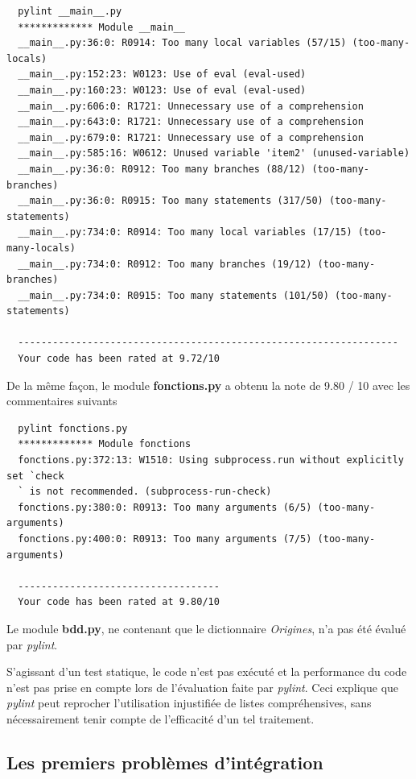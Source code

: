 \documentclass[twoside,a4paper,11pt,frenchb,openany]{report}
\begin{document}
\begin{verbatim}  pylint __main__.py
  ************* Module __main__
  __main__.py:36:0: R0914: Too many local variables (57/15) (too-many-locals)
  __main__.py:152:23: W0123: Use of eval (eval-used)
  __main__.py:160:23: W0123: Use of eval (eval-used)
  __main__.py:606:0: R1721: Unnecessary use of a comprehension
  __main__.py:643:0: R1721: Unnecessary use of a comprehension
  __main__.py:679:0: R1721: Unnecessary use of a comprehension
  __main__.py:585:16: W0612: Unused variable 'item2' (unused-variable)
  __main__.py:36:0: R0912: Too many branches (88/12) (too-many-branches)
  __main__.py:36:0: R0915: Too many statements (317/50) (too-many-statements)
  __main__.py:734:0: R0914: Too many local variables (17/15) (too-many-locals)
  __main__.py:734:0: R0912: Too many branches (19/12) (too-many-branches)
  __main__.py:734:0: R0915: Too many statements (101/50) (too-many-statements)

  ------------------------------------------------------------------
  Your code has been rated at 9.72/10\end{verbatim}

De la même façon, le module \textbf{fonctions.py} a obtenu la note de 9.80 / 10 avec les commentaires suivants

\begin{verbatim}  pylint fonctions.py
  ************* Module fonctions
  fonctions.py:372:13: W1510: Using subprocess.run without explicitly set `check
  ` is not recommended. (subprocess-run-check)
  fonctions.py:380:0: R0913: Too many arguments (6/5) (too-many-arguments)
  fonctions.py:400:0: R0913: Too many arguments (7/5) (too-many-arguments)

  -----------------------------------
  Your code has been rated at 9.80/10\end{verbatim}

Le module \textbf{bdd.py}, ne contenant que le dictionnaire \textit{Origines}, n'a pas été évalué par \textit{pylint}.

S'agissant d'un test statique, le code n'est pas exécuté et la performance du code n'est pas prise en compte lors de l'évaluation faite par \textit{pylint}. Ceci explique que \textit{pylint} peut reprocher l'utilisation injustifiée de listes compréhensives, sans nécessairement tenir compte de l'efficacité d'un tel traitement.




\subsection{Les premiers problèmes d'intégration}
\end{document}
